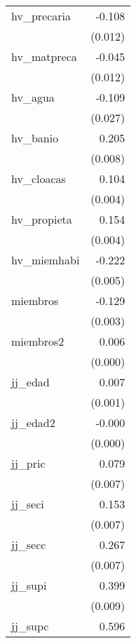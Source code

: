 {\begin{longtable}{l*{1}{D{.}{.}{-1}}}
\addlinespace
hv\_precaria &      -0.108\sym{***}\\
            &     (0.012)         \\
\addlinespace
hv\_matpreca &      -0.045\sym{***}\\
            &     (0.012)         \\
\addlinespace
hv\_agua     &      -0.109\sym{***}\\
            &     (0.027)         \\
\addlinespace
hv\_banio    &       0.205\sym{***}\\
            &     (0.008)         \\
\addlinespace
hv\_cloacas  &       0.104\sym{***}\\
            &     (0.004)         \\
\addlinespace
hv\_propieta &       0.154\sym{***}\\
            &     (0.004)         \\
\addlinespace
hv\_miemhabi &      -0.222\sym{***}\\
            &     (0.005)         \\
\addlinespace
miembros    &      -0.129\sym{***}\\
            &     (0.003)         \\
\addlinespace
miembros2   &       0.006\sym{***}\\
            &     (0.000)         \\
\addlinespace
jj\_edad     &       0.007\sym{***}\\
            &     (0.001)         \\
\addlinespace
jj\_edad2    &      -0.000\sym{***}\\
            &     (0.000)         \\
\addlinespace
jj\_pric     &       0.079\sym{***}\\
            &     (0.007)         \\
\addlinespace
jj\_seci     &       0.153\sym{***}\\
            &     (0.007)         \\
\addlinespace
jj\_secc     &       0.267\sym{***}\\
            &     (0.007)         \\
\addlinespace
jj\_supi     &       0.399\sym{***}\\
            &     (0.009)         \\
\addlinespace
jj\_supc     &       0.596\sym{***}\\

\end{longtable}}

